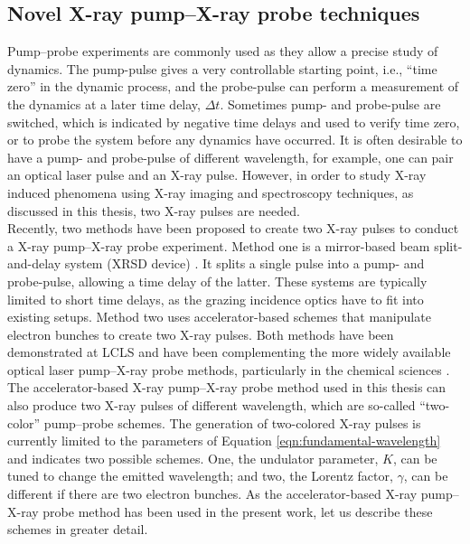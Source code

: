\subsection{Novel X-ray pump–X-ray probe techniques}\label{sec:novel-pump--probe-tech}
Pump--probe experiments are commonly used as they allow a precise study of dynamics. The pump-pulse gives a very controllable starting point, i.e., ``time zero'' in the dynamic process, and the probe-pulse can perform a measurement of the dynamics at a later time delay, $\Delta t$. Sometimes pump- and probe-pulse are switched, which is indicated by negative time delays and used to verify time zero, or to probe the system before any dynamics have occurred.
It is often desirable to have a pump- and probe-pulse of different wavelength, for example, one can pair an optical laser pulse and an X-ray pulse.
However, in order to study X-ray induced phenomena using X-ray imaging and spectroscopy techniques, as discussed in this thesis, two X-ray pulses are needed.\\[1\baselineskip]
%
Recently, two methods have been proposed to create two X-ray pulses to conduct a X-ray pump--X-ray probe experiment. Method one is a mirror-based beam split-and-delay system (XRSD device) \citep{Castagna-2013-JPCS,Murphy-2012-SPIE,Berrah-2016-OE}. It splits a single pulse into a pump- and probe-pulse, allowing a time delay of the latter. These systems are typically limited to short time delays, as the grazing incidence optics have to fit into existing setups. Method two uses accelerator-based schemes \citep{Lutman-2013-PRL,Marinelli-2015-NatComm} that manipulate electron bunches to create two X-ray pulses.
Both methods have been demonstrated at LCLS and have been complementing the more widely available optical laser pump--X-ray probe methods, particularly in the chemical sciences \citep{Picon-2016-NatComm,Ferguson-2016-SciAdv,Liekhus-Schmaltz-2015-NatComm}.\\[1\baselineskip]
%
The accelerator-based X-ray pump--X-ray probe method used in this thesis can also produce two X-ray pulses of different wavelength, which are so-called ``two-color'' pump--probe schemes. The generation of two-colored X-ray pulses is currently limited to the parameters of Equation \eqref{eqn:fundamental-wavelength} and indicates two possible schemes. One, the undulator parameter, $K$, can be tuned to change the emitted wavelength; and two, the Lorentz factor, $\gamma$, can be different if there are two electron bunches. As the accelerator-based X-ray pump--X-ray probe method has been used in the present work, let us describe these schemes in greater detail.
%
%
%
